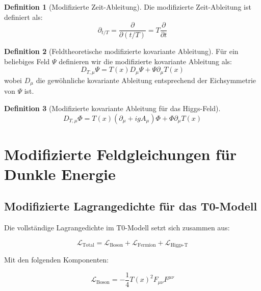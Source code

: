 \documentclass[a4paper,12pt]{article}
\theoremstyle{definition}
\newtheorem{definition}{Definition}[theorem]
\theoremstyle{remark}
\newcommand{\Tfield}{T(x)} %
\newcommand{\DhiggsT}{\Tfield (\partial_\mu + igA_\mu)\Phi + \Phi \partial_\mu \Tfield}
\begin{document}
	\begin{definition}[Modifizierte Zeit-Ableitung]
		Die modifizierte Zeit-Ableitung ist definiert als:
		\begin{equation}
			\partial_{t/T} = \frac{\partial}{\partial(t/T)} = T\frac{\partial}{\partial t}
		\end{equation}
	\end{definition}
	
	\begin{definition}[Feldtheoretische modifizierte kovariante Ableitung]
		Für ein beliebiges Feld \(\Psi\) definieren wir die modifizierte kovariante Ableitung als:
		\begin{equation}
			D_{T,\mu}\Psi = \Tfield D_\mu \Psi + \Psi \partial_\mu \Tfield
		\end{equation}
		wobei \(D_\mu\) die gewöhnliche kovariante Ableitung entsprechend der Eichsymmetrie von \(\Psi\) ist.
	\end{definition}
	
	\begin{definition}[Modifizierte kovariante Ableitung für das Higgs-Feld]
		\begin{equation}
			D_{T,\mu}\Phi = \DhiggsT
		\end{equation}
	\end{definition}
	
	\section{Modifizierte Feldgleichungen für Dunkle Energie}
	
	\subsection{Modifizierte Lagrangedichte für das T0-Modell}
	
	Die vollständige Lagrangedichte im T0-Modell setzt sich zusammen aus:
	
	\begin{equation}
		\mathcal{L}_{\text{Total}} = \mathcal{L}_{\text{Boson}} + \mathcal{L}_{\text{Fermion}} + \mathcal{L}_{\text{Higgs-T}}
	\end{equation}
	
	Mit den folgenden Komponenten:
	
	\begin{equation}
		\mathcal{L}_{\text{Boson}} = -\frac{1}{4} \Tfield^2 F_{\mu\nu}F^{\mu\nu}
	\end{equation}
	
\end{document}
